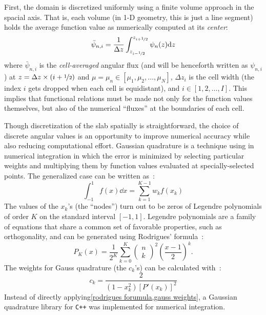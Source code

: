 \documentclass{NE515}
\theoremstyle{definition}
\begin{document}
    First, the domain is discretized uniformly using a finite volume approach in the spacial axis.
    That is, each volume (in 1-D geometry, this is just a line segment) holds the average function value as numerically computed at its \textit{center}:
    \begin{equation}
        \bar{\psi}_{n,i}=\frac{1}{\Delta z}\int_{z_{i-\nicefrac{1}{2}}}^{z_{i+\nicefrac{1}{2}}} \psi_n(z)\dd z
    \end{equation}
    where $\bar{\psi}_{n,i}$ is the \textit{cell-averaged} angular flux (and will be henceforth written as $\psi_{n,i}$) at $z=\Delta z\times\left( i+\nicefrac{1}{2}\right)$ and $\mu=\mu_n\in[\mu_1,\mu_2,\ldots,\mu_N]$, $\Delta z_i$ is the cell width (the index $i$ gets dropped when each cell is equidistant), and $i\in[1,2,\ldots,I]$.
    This implies that functional relations must be made not only for the function values themselves, but also of the numerical ``fluxes'' at the boundaries of each cell.

    Though discretization of the slab spatially is straightforward, the choice of discrete angular values is an opportunity to improve numerical accuracy while also reducing computational effort.
    Gaussian quadrature is a technique using in numerical integration in which the error is minimized by selecting particular weights and multiplying them by function values evaluated at specially-selected points.
    The generalized case can be written as~\cite{gezerlisNumericalMethodsPhysicsa}:
    \begin{equation}
        \int_{-1}^{1} f(x) \dd x = \sum_{k=1}^{K-1} w_k f(x_k)
    \end{equation}
    The values of the $x_k$'s (the ``nodes'') turn out to be zeros of Legendre polynomials of order $K$ on the standard interval $[-1,1]$.
    Legendre polynomials are a family of equations that share a common set of favorable properties, such as orthogonality, and can be generated using Rodrigues' formula~\cite{LegendrePolynomials2024}:
    \begin{equation}
        \label{rodrigues forumula}
        P_K (x)= \frac{1}{2^K} \sum_{k=0}^{K}
        \begin{pmatrix}
            n \\
            k
        \end{pmatrix}^2
        \left( \frac{x-1}{2} \right)^k.
    \end{equation}
    The weights for Gauss quadrature (the $c_k$'s) can be calculated with~\cite{gezerlisNumericalMethodsPhysicsa}:
    \begin{equation}
        \label{gauss weights}
        c_k=\frac{2}{\left( 1-x_k^2 \right)\left[ P' (x_k) \right]^2}
    \end{equation}
    Instead of directly applying\cref{rodrigues forumula,gauss weights}, a Gaussian quadrature library for \texttt{C++} was implemented for numerical integration.
\end{document}
